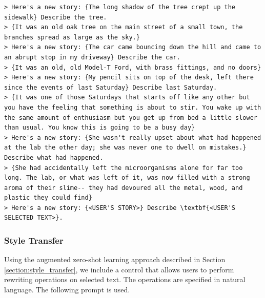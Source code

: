 \begin{lstlisting}
> Here's a new story: {The long shadow of the tree crept up the sidewalk} Describe the tree.
> {It was an old oak tree on the main street of a small town, the branches spread as large as the sky.}
> Here's a new story: {The car came bouncing down the hill and came to an abrupt stop in my driveway} Describe the car.
> {It was an old, old Model-T Ford, with brass fittings, and no doors}
> Here's a new story: {My pencil sits on top of the desk, left there since the events of last Saturday} Describe last Saturday.
> {It was one of those Saturdays that starts off like any other but you have the feeling that something is about to stir. You wake up with the same amount of enthusiasm but you get up from bed a little slower than usual. You know this is going to be a busy day}
> Here's a new story: {She wasn't really upset about what had happened at the lab the other day; she was never one to dwell on mistakes.} Describe what had happened.
> {She had accidentally left the microorganisms alone for far too long. The lab, or what was left of it, was now filled with a strong aroma of their slime-- they had devoured all the metal, wood, and plastic they could find}
> Here's a new story: {<USER'S STORY>} Describe \textbf{<USER'S SELECTED TEXT>}.
\end{lstlisting}

\subsubsection{Style Transfer}
Using the augmented zero-shot learning approach described in Section \ref{section:style_transfer}, we include a control that allows users to perform rewriting operations on selected text. The operations are specified in natural language.
The following prompt is used.

